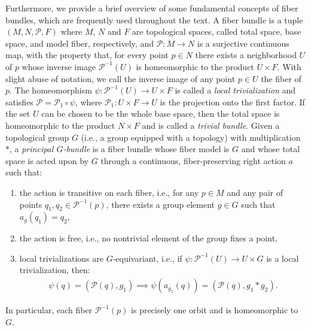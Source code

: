 \documentclass[10pt,leqno]{amsart}
\begin{document}
%
Furthermore, we provide a brief overview of some fundamental concepts of fiber bundles, which are frequently used throughout the text. A fiber bundle is a tuple $(M, N, \mathcal{P}, F)$ where $M$, $N$ and $F$ are topological spaces, called total space, base space, and model fiber, respectively, and $\mathcal{P} : M \to N$ is a surjective continuous map, with the property that, for every point $p \in N$ there exists a neighborhood $U$ of $p$ whose inverse image $\mathcal{P}^{-1}(U)$ is homeomorphic to the product $U \times F$. With slight abuse of notation, we call the inverse image of any point $p \in U$ the fiber of $p$. The homeomorphism $\psi : \mathcal{P}^{-1}(U) \to U \times F$ is called a \emph{local trivialization} and satisfies $\mathcal{P} = \mathcal{P}_1 \circ \psi$, where $\mathcal{P}_1 : U \times F \to U$ is the projection onto the first factor. If the set $U$ can be chosen to be the whole base space, then the total space is homeomorphic to the product $N \times F$ and is called a \emph{trivial bundle}. Given a topological group $G$ (i.e., a group equipped with a topology) with multiplication $*$, a \emph{principal $G$-bundle} is a fiber bundle whose fiber model is $G$ and whose total space is acted upon by $G$ through a continuous, fiber-preserving right action $a$ such that:
\begin{enumerate}[label=$\rhd$]
    \item the action is transitive on each fiber, i.e., for any $p \in M$ and any pair of points $q_1, q_2 \in \mathcal{P}^{-1}(p)$, there exists a group element $g \in G$ such that $a_g(q_1) = q_2$,
    \item the action is free, i.e., no nontrivial element of the group fixes a point,
    \item local trivializations are $G$-equivariant, i.e., if $\psi : \mathcal{P}^{-1}(U) \to U \times G$ is a local trivialization, then:
    \begin{align*}
        \psi(q) = (\mathcal{P}(q), g_1) \implies \psi(a_{g_2}(q)) = (\mathcal{P}(q), g_1 * g_2).
    \end{align*}
\end{enumerate}
In particular, each fiber $\mathcal{P}^{-1}(p)$ is precisely one orbit and is homeomorphic to $G$. %
\end{document}
